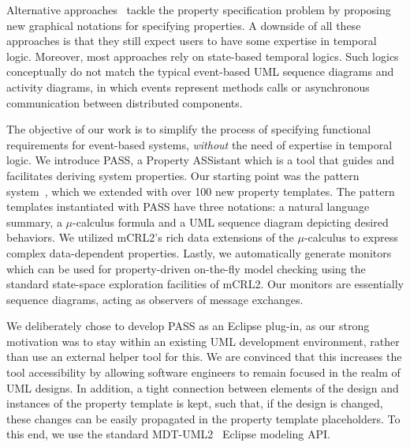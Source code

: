 \documentclass[letter]{llncs}
\begin{document}
Alternative
approaches~\cite{Autili:2007:GSS:1290845.1290859,Lee97agraphical,Smith:2001:ECG:882477.883639,Knapp:2006:MCU:1762828.1762836,Lilius99vuml:a,Kugler:2005:TLS:2140653.2140692,MVPSA}
tackle the property specification problem by proposing new graphical
notations for specifying properties. A downside of all these approaches is
that they still expect users to have some expertise in temporal logic.
Moreover, most approaches rely on state-based temporal logics. Such
logics conceptually do not match the typical event-based UML sequence
diagrams and activity diagrams, in which events represent methods calls
or asynchronous communication between distributed components.

The objective of our work is to simplify the process of specifying
functional requirements for event-based systems, \emph{without}
the need of expertise in temporal logic.  We introduce PASS,
a Property ASSistant which is a tool that guides and facilitates 
deriving system properties. Our starting point was the pattern
system~\cite{Dwyer:1999:PPS:302405.302672}, which we extended with over
100 new property templates. 
The pattern templates instantiated with PASS have three notations:
a natural language summary, a $\mu$-calculus formula and a UML sequence
diagram depicting desired behaviors.  We utilized mCRL2's rich data
extensions of the $\mu$-calculus to express complex data-dependent
properties.  Lastly, we automatically generate
monitors which can be used for property-driven on-the-fly model checking
using the standard state-space exploration facilities
of mCRL2.
Our monitors are essentially sequence diagrams,  acting as
observers of message exchanges.

We deliberately chose to develop PASS as an Eclipse plug-in, as
our strong motivation was to stay within an existing UML development
environment, rather than use an external helper tool for this.  We are
convinced that this increases the tool accessibility by allowing software
engineers to remain focused in the realm of UML designs.  In addition,
a tight connection between elements of the design and instances of the property
template is kept, such that, if the design is changed, these changes can
be easily propagated in the property template placeholders.  To this end,
we use the standard MDT-UML2~\cite{MDTUML2} Eclipse modeling API.
\end{document}
